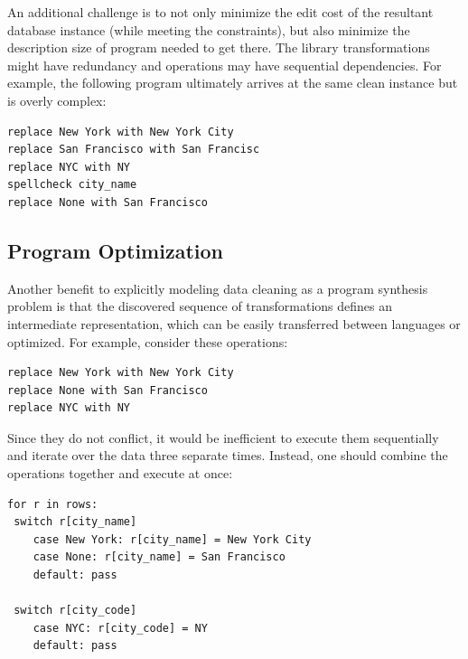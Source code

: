 An additional challenge is to not only minimize the edit cost of the resultant database instance (while meeting the constraints), but also minimize the description size of program needed to get there. The library transformations might have redundancy and operations may have sequential dependencies. For example, the following program ultimately arrives at the same clean instance but is overly complex:
\begin{lstlisting}
replace New York with New York City
replace San Francisco with San Francisc
replace NYC with NY
spellcheck city_name
replace None with San Francisco
\end{lstlisting}

\subsection{Program Optimization}
Another benefit to explicitly modeling data cleaning as a program synthesis problem is that the discovered sequence of transformations defines an intermediate
representation, which can be easily transferred between languages or optimized.
For example, consider these operations:
\begin{lstlisting}
replace New York with New York City
replace None with San Francisco
replace NYC with NY
\end{lstlisting}
Since they do not conflict, it would be inefficient to execute them sequentially and iterate over the data three separate times.
Instead, one should combine the operations together and execute at once:
\begin{lstlisting}
for r in rows:
 switch r[city_name]
    case New York: r[city_name] = New York City
    case None: r[city_name] = San Francisco
    default: pass
    
 switch r[city_code]
    case NYC: r[city_code] = NY
    default: pass
\end{lstlisting}


